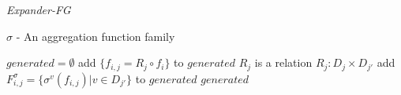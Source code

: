 \documentclass{article}
\theoremstyle{definition}
\begin{document}
\begin{algorithm}[H]
	\caption{\emph{Expander-FG}}
	\label{code-compete}
	\small
	$\sigma$ - An aggregation function family
	\begin{algorithmic}
		\State $generated=\emptyset$
		\State add $\{f_{i,j}=R_j\circ f_i\}$ to $generated$
		\Else \Comment $R_j$ is a relation $R_j:D_j\times D_{j'}$
		\State add $F^\sigma_{i,j}=\{\sigma^v(f_{i,j})|v\in D_{j'}\}$ to $generated$
		\EndIf
		\EndFor
		\EndFor
		\State \Return $generated$ 
		\EndFunction
		
	\end{algorithmic}
\end{algorithm}
\end{document}
